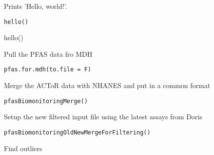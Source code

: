 \documentclass[letterpaper]{book}
\begin{document}
%
\begin{Description}\relax
Prints 'Hello, world!'.
\end{Description}
%
\begin{Usage}
\begin{verbatim}
hello()
\end{verbatim}
\end{Usage}
%
\begin{Examples}
\begin{ExampleCode}
hello()
\end{ExampleCode}
\end{Examples}
%
\begin{Description}\relax
Pull the PFAS data fro MDH
\end{Description}
%
\begin{Usage}
\begin{verbatim}
pfas.for.mdh(to.file = F)
\end{verbatim}
\end{Usage}
%
\begin{Description}\relax
Merge the ACToR data with NHANES and put in a common format
\end{Description}
%
\begin{Usage}
\begin{verbatim}
pfasBiomonitoringMerge()
\end{verbatim}
\end{Usage}
%
\begin{Description}\relax
Setup the new filtered input file using the latest assays from Doris
\end{Description}
%
\begin{Usage}
\begin{verbatim}
pfasBiomonitoringOldNewMergeForFiltering()
\end{verbatim}
\end{Usage}
%
\begin{Description}\relax
Find outliers
\end{Description}
\end{document}
